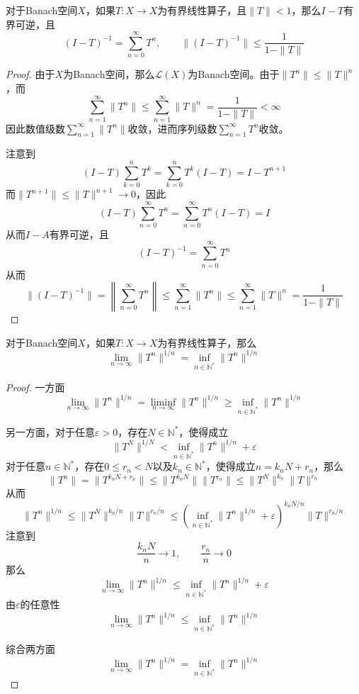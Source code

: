 \documentclass[lang = cn, scheme = chinese, thmcnt = section]{elegantbook}
\newcommand{\N}{\mathbb{N}}            %
\begin{document}
\begin{proposition}
	对于Banach空间$X$，如果$T:X\to X$为有界线性算子，且$\|T\|<1$，那么$I-T$有界可逆，且
	$$
	(I-T)^{-1}=\sum_{n=0}^{\infty}T^n,\qquad 
	\|(I-T)^{-1}\|\le \frac{1}{1-\|T\|}
	$$
\end{proposition}

\begin{proof}
	由于$X$为Banach空间，那么$\mathcal{L}(X)$为Banach空间。由于$\|T^n\|\le \|T\|^n$，而
	$$
	\sum_{n=1}^{\infty}\|T^n\|\le\sum_{n=1}^{\infty}\|T\|^n=\frac{1}{1-\|T\|}<\infty
	$$
	因此数值级数$\displaystyle \sum_{n=1}^{\infty}\|T^n\|$收敛，进而序列级数$\displaystyle \sum_{n=1}^{\infty}T^n$收敛。
	
	注意到
	$$
	(I-T)\sum_{k=0}^{n}T^k=\sum_{k=0}^{n}T^k(I-T)=I-T^{n+1}
	$$
	而$\|T^{n+1}\|\le \|T\|^{n+1}\to 0$​，因此
	$$
	(I-T)\sum_{n=0}^{\infty}T^n=\sum_{n=0}^{\infty}T^n(I-T)=I
	$$
	从而$I-A$有界可逆，且
	$$
	(I-T)^{-1}=\sum_{n=0}^{\infty}T^n
	$$
	从而
	$$
	\|(I-T)^{-1}\|=\left\| \sum_{n=0}^{\infty}T^n \right\|\le\sum_{n=1}^{\infty}\|T^n\|\le\sum_{n=1}^{\infty}\|T\|^n=\frac{1}{1-\|T\|}
	$$
\end{proof}

\begin{proposition}
	对于Banach空间$X$，如果$T:X\to X$为有界线性算子，那么
	$$
	\lim_{n\to\infty}\|T^n\|^{1/n}=\inf_{n\in\N^*}\|T^n\|^{1/n}
	$$
\end{proposition}

\begin{proof}
	一方面
	$$
	\lim_{n\to\infty}\|T^n\|^{1/n}=\liminf_{n\to\infty}\|T^n\|^{1/n}\ge\inf_{n\in\N^*}\|T^n\|^{1/n}
	$$
	
	另一方面，对于任意$\varepsilon>0$，存在$N\in\N^*$，使得成立
	$$
	\|T^N\|^{1/N}<\inf_{n\in\N^*}\|T^n\|^{1/n}+\varepsilon
	$$
	对于任意$n\in\N^*$，存在$0\le r_n<N$以及$k_n\in\N^*$，使得成立$n=k_nN+r_n$，那么
	$$
	\|T^n\|=\|T^{k_nN+r_n}\|\le\|T^{k_nN}\|\|T^{r_n}\|\le\|T^N\|^{k_n}\|T\|^{r_n}
	$$
	从而
	$$
	\|T^n\|^{1/n}\le \|T^N\|^{k_n/n}\|T\|^{r_n/n}\le\left(\inf_{n\in\N^*}\|T^n\|^{1/n}+\varepsilon\right)^{k_nN/n}\|T\|^{r_n/n}
	$$
	注意到
	$$
	\frac{k_nN}{n}\to1,\qquad \frac{r_n}{n}\to0
	$$
	那么
	$$
	\lim_{n\to\infty}\|T^n\|^{1/n}\le \inf_{n\in\N^*}\|T^n\|^{1/n}+\varepsilon
	$$
	由$\varepsilon$​的任意性
	$$
	\lim_{n\to\infty}\|T^n\|^{1/n}\le \inf_{n\in\N^*}\|T^n\|^{1/n}
	$$
	
	综合两方面
	$$
	\lim_{n\to\infty}\|T^n\|^{1/n}=\inf_{n\in\N^*}\|T^n\|^{1/n}
	$$
\end{proof}
\end{document}
